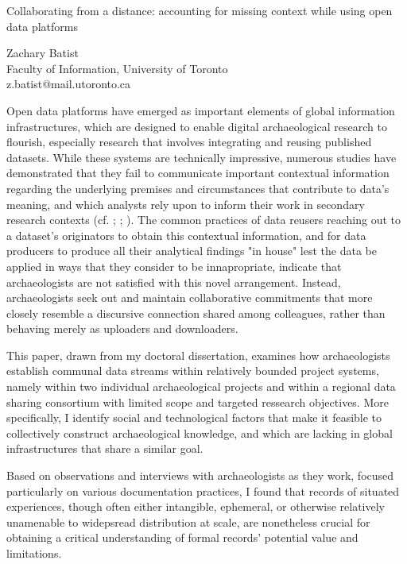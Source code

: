 \documentclass[a4paper]{article}
\begin{document}

\large
\begin{center}
Collaborating from a distance: accounting for missing context while using open data platforms

\large
Zachary Batist\\

\small  
Faculty of Information, University of Toronto\\
z.batist@mail.utoronto.ca\\

\end{center}

\normalsize

Open data platforms have emerged as important elements of global information infrastructures, which are designed to enable digital archaeological research to flourish, especially research that involves integrating and reusing published datasets. While these systems are technically impressive, numerous studies have demonstrated that they fail to communicate important contextual information regarding the underlying premises and circumstances that contribute to data's meaning, and which analysts rely upon to inform their work in secondary research contexts (cf. \cite{faniel2013}; \cite{opitz2021}; \cite{huggett2022}). The common practices of data reusers reaching out to a dataset's originators to obtain this contextual information, and for data producers to produce all their analytical findings "in house" lest the data be applied in ways that they consider to be innapropriate, indicate that archaeologists are not satisfied with this novel arrangement. Instead, archaeologists seek out and maintain collaborative commitments that more closely resemble a discursive connection shared among colleagues, rather than behaving merely as uploaders and downloaders.

This paper, drawn from my doctoral dissertation, examines how archaeologists establish communal data streams within relatively bounded project systems, namely within two individual archaeological projects and within a regional data sharing consortium with limited scope and targeted ressearch objectives. More specifically, I identify social and technological factors that make it feasible to collectively construct archaeological knowledge, and which are lacking in global infrastructures that share a similar goal.

Based on observations and interviews with archaeologists as they work, focused particularly on various documentation practices, I found that records of situated experiences, though often either intangible, ephemeral, or otherwise relatively unamenable to widepsread distribution at scale, are nonetheless crucial for obtaining a critical understanding of formal records' potential value and limitations.
\end{document}
